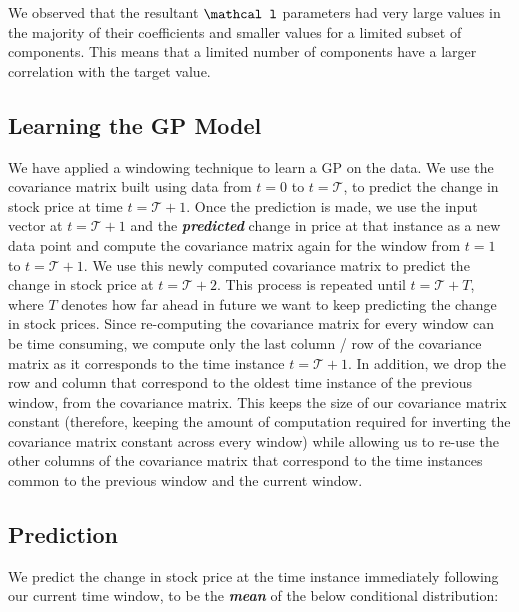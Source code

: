 \documentclass{article} %
\def\bfl{\mathbf \mathcal l}
\begin{document}
We observed that the resultant $\bfl$ parameters had very large values in the majority of their coefficients and smaller values for a limited subset of components.
This means that a limited number of components have a larger correlation with the target value.


\subsection{Learning the GP Model}

We have applied a windowing technique to learn a GP on the data. We use the covariance matrix built using data from $t = 0$ to $t = \mathcal{T}$, to predict the change in stock price at time $t = \mathcal{T}+1$. Once the prediction is made, we use the input vector at $t = \mathcal{T}+1$ and the \textbf{\textit{predicted}} change in price at that instance as a new data point and compute the covariance matrix again for the window from $t = 1$ to $t = \mathcal{T}+1$. We use this newly computed covariance matrix to predict the change in stock price at $t=\mathcal{T}+2$. This process is repeated until $t = \mathcal{T}+T$, where $T$ denotes how far ahead in future we want to keep predicting the change in stock prices. Since re-computing the covariance matrix for every window can be time consuming, we compute only the last column / row of the covariance matrix as it corresponds to the time instance $t = \mathcal{T}+1$. In addition, we drop the row and column that correspond to the oldest time instance of the previous window, from the covariance matrix. This keeps the size of our covariance matrix constant (therefore, keeping the amount of computation required for inverting the covariance matrix constant across every window) while allowing us to re-use the other columns of the covariance matrix that correspond to the time instances common to the previous window and the current window.

\subsection{Prediction}

We predict the change in stock price at the time instance immediately following our current time window, to be the \textbf{\textit{mean}} of the below conditional distribution:
\end{document}
